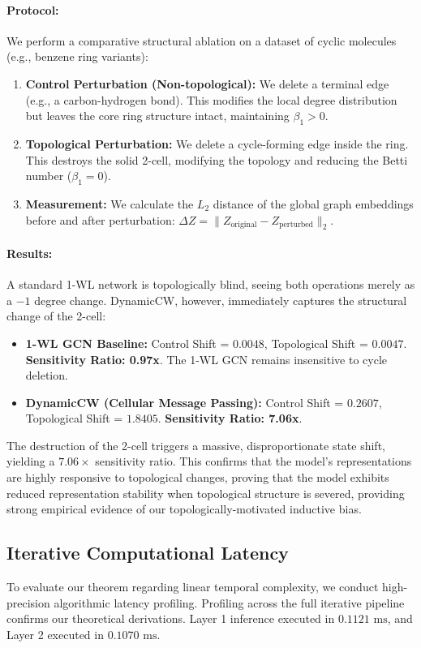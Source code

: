 \documentclass[11pt, letterpaper]{article}
\begin{document}
\paragraph{Protocol:}
We perform a comparative structural ablation on a dataset of cyclic molecules (e.g., benzene ring variants):
\begin{enumerate}
    \item \textbf{Control Perturbation (Non-topological):} We delete a terminal edge (e.g., a carbon-hydrogen bond). This modifies the local degree distribution but leaves the core ring structure intact, maintaining $\beta_1 > 0$.
    \item \textbf{Topological Perturbation:} We delete a cycle-forming edge inside the ring. This destroys the solid 2-cell, modifying the topology and reducing the Betti number ($\beta_1 = 0$).
    \item \textbf{Measurement:} We calculate the $L_2$ distance of the global graph embeddings before and after perturbation: $\Delta Z = \|Z_{\text{original}} - Z_{\text{perturbed}}\|_2$.
\end{enumerate}

\paragraph{Results:}
A standard 1-WL network is topologically blind, seeing both operations merely as a $-1$ degree change. DynamicCW, however, immediately captures the structural change of the 2-cell:
\begin{itemize}
    \item \textbf{1-WL GCN Baseline:} Control Shift = $0.0048$, Topological Shift = $0.0047$. \textbf{Sensitivity Ratio: 0.97x}. The 1-WL GCN remains insensitive to cycle deletion.
    \item \textbf{DynamicCW (Cellular Message Passing):} Control Shift = $0.2607$, Topological Shift = $1.8405$. \textbf{Sensitivity Ratio: 7.06x}.
\end{itemize}
The destruction of the 2-cell triggers a massive, disproportionate state shift, yielding a $7.06\times$ sensitivity ratio. This confirms that the model's representations are highly responsive to topological changes, proving that the model exhibits reduced representation stability when topological structure is severed, providing strong empirical evidence of our topologically-motivated inductive bias.

\subsection{Iterative Computational Latency}
To evaluate our theorem regarding linear temporal complexity, we conduct high-precision algorithmic latency profiling. Profiling across the full iterative pipeline confirms our theoretical derivations. Layer 1 inference executed in $0.1121\text{ ms}$, and Layer 2 executed in $0.1070\text{ ms}$. 
\end{document}
